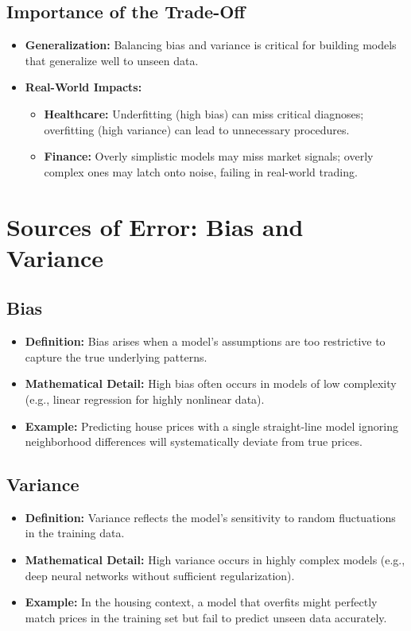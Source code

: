 \documentclass{article}
\begin{document}
\subsection{Importance of the Trade-Off}
\begin{itemize}
    \item \textbf{Generalization:} Balancing bias and variance is critical for building models that generalize well to unseen data.
    \item \textbf{Real-World Impacts:}
    \begin{itemize}
        \item \textbf{Healthcare:} Underfitting (high bias) can miss critical diagnoses; overfitting (high variance) can lead to unnecessary procedures.
        \item \textbf{Finance:} Overly simplistic models may miss market signals; overly complex ones may latch onto noise, failing in real-world trading.
    \end{itemize}
\end{itemize}

\section{Sources of Error: Bias and Variance}

\subsection{Bias}
\begin{itemize}
    \item \textbf{Definition:} Bias arises when a model’s assumptions are too restrictive to capture the true underlying patterns.
    \item \textbf{Mathematical Detail:} High bias often occurs in models of low complexity (e.g., linear regression for highly nonlinear data).
    \item \textbf{Example:} Predicting house prices with a single straight-line model ignoring neighborhood differences will systematically deviate from true prices.
\end{itemize}

\subsection{Variance}
\begin{itemize}
    \item \textbf{Definition:} Variance reflects the model’s sensitivity to random fluctuations in the training data.
    \item \textbf{Mathematical Detail:} High variance occurs in highly complex models (e.g., deep neural networks without sufficient regularization).
    \item \textbf{Example:} In the housing context, a model that overfits might perfectly match prices in the training set but fail to predict unseen data accurately.
\end{itemize}
\end{document}
